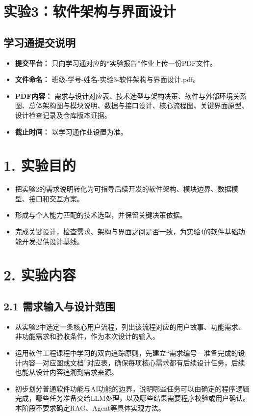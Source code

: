 \documentclass[UTF8,12pt,a4paper]{ctexart}
\begin{document}
\section*{实验3：软件架构与界面设计}

\subsection*{学习通提交说明}

\begin{itemize}
  \item \textbf{提交平台：} 只向学习通对应的“实验报告”作业上传一份PDF文件。
  \item \textbf{文件命名：} 班级-学号-姓名-实验3-软件架构与界面设计.pdf。
  \item \textbf{PDF内容：} 需求与设计对应表、技术选型与架构决策、软件与外部环境关系图、总体架构图与模块说明、数据与接口设计、核心流程图、关键界面原型、设计检查记录及仓库版本证据。
  \item \textbf{截止时间：} 以学习通作业设置为准。
\end{itemize}

\section*{1. 实验目的}

\begin{itemize}
  \item 把实验2的需求说明转化为可指导后续开发的软件架构、模块边界、数据模型、接口和交互方案。
  \item 形成与个人能力匹配的技术选型，并保留关键决策依据。
  \item 完成关键设计，检查需求、架构与界面之间是否一致，为实验4的软件基础功能开发提供设计基线。
\end{itemize}

\section*{2. 实验内容}

\subsection*{2.1 需求输入与设计范围}

\begin{itemize}
  \item 从实验2中选定一条核心用户流程，列出该流程对应的用户故事、功能需求、非功能需求和验收条件，作为本次设计的输入。
  \item 运用软件工程课程中学习的双向追踪原则，先建立“需求编号—准备完成的设计内容—对应图或文档”对应表，确保每项核心需求都有后续设计任务，后续也能从设计内容追溯到需求来源。
  \item 初步划分普通软件功能与AI功能的边界，说明哪些任务可以由确定的程序逻辑完成，哪些任务准备交给LLM处理，以及哪些结果需要程序校验或用户确认。本阶段不要求确定RAG、Agent等具体实现方法。
\end{itemize}
\end{document}
